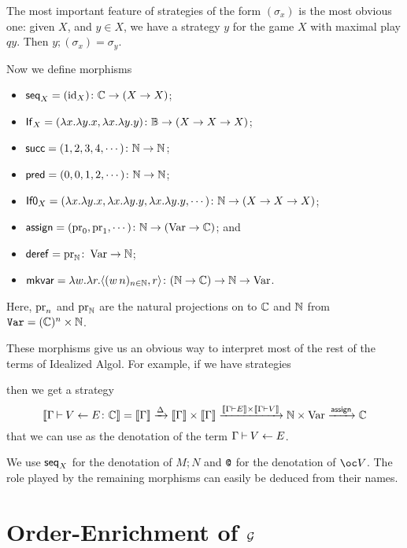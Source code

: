 The most important feature of strategies of the form $(\sigma_x)$ is the most obvious one: given $X$, and $y\in X$, we have a strategy $y$ for the game $X$ with maximal play $qy$.  
Then $y;(\sigma_x) = \sigma_y$.

Now we define morphisms
\begin{itemize}
  \item $\operatorname{{\mathsf{seq}}}_X = (\operatorname{id}_X) \colon \mathbb{C} \to (X \to X)$;
  \item $\operatorname{\mathsf{If}}_X = (\lambda x.\lambda y.x,\lambda x.\lambda y.y) \colon \mathbb{B} \to (X \to X \to X)$;
  \item $\operatorname{{\mathsf{succ}}} = (1, 2, 3, 4,\cdots) \colon \mathbb{N} \to \mathbb{N}$;
  \item $\operatorname{{\mathsf{pred}}} = (0,0,1,2,\cdots)\colon \mathbb{N} \to \mathbb{N}$;
  \item $\operatorname{{\mathsf{If0}}}_X = (\lambda x.\lambda y.x,\lambda x.\lambda y.y,\lambda x.\lambda y.y,\cdots)\colon \mathbb{N} \to (X \to X \to X)$;
  \item $\operatorname{\mathsf{assign}} = (\operatorname{pr}_0,\operatorname{pr}_1,\cdots) \colon \mathbb{N} \to (\operatorname{Var} \to \mathbb{C})$; and
  \item $\operatorname{\mathsf{deref}} = \operatorname{pr}_{\mathbb{N}} \colon \operatorname{Var} \to \mathbb{N}$;
  \item $\operatorname{{\mathsf{mkvar}}} = \lambda w.\lambda r.\langle (w\,n)_{n\in\mathbb{N}},r\rangle \colon (\mathbb{N} \to \mathbb{C}) \to \mathbb{N} \to \operatorname{Var}$.
\end{itemize}
Here, $\operatorname{pr}_n$ and $\operatorname{pr}_{\mathbb{N}}$ are the natural projections on to $\mathbb{C}$ and $\mathbb{N}$ from ${\mathtt{Var}} = (\mathbb{C})^n \times \mathbb{N}$.

These morphisms give us an obvious way to interpret most of the rest of the terms of Idealized Algol.  
For example, if we have strategies
then we get a strategy
\[
  \left\llbracket\Gamma\mathbin{\vdash} V\gets E \colon \mathbb{C}\right\rrbracket = \left\llbracket\Gamma\right\rrbracket \xrightarrow{\Delta} \left\llbracket\Gamma\right\rrbracket\times\left\llbracket\Gamma\right\rrbracket \xrightarrow{\left\llbracket\Gamma\mathbin{\vdash} E\right\rrbracket\times\left\llbracket\Gamma\mathbin{\vdash} V\right\rrbracket} \mathbb{N} \times \operatorname{Var} \xrightarrow{\operatorname{\mathsf{assign}}} \mathbb{C}
  \]
that we can use as the denotation of the term $\Gamma \mathbin{\vdash} V \gets E$.

We use $\operatorname{{\mathsf{seq}}}_X$ for the denotation of $M;N$ and $\texttt{@}$ for the denotation of $\oc V$.  
The role played by the remaining morphisms can easily be deduced from their names.

\section{Order-Enrichment of $\mathcal G$}


